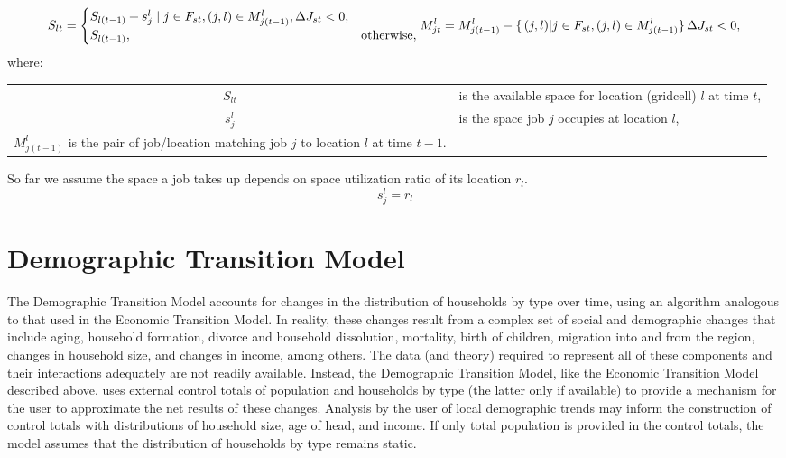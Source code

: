 \begin{equation}
S_{lt} = \begin{cases}
        S_{l(t-1)} + s^l_j \mid j \in F_{st}, (j, l) \in M^l_{j(t-1)},  \Delta J_{st} < 0,\\
        S_{l(t-1)}, & \text{otherwise},\\
    \end{cases}
M^l_{jt} = M^l_{j(t-1)} - \{\, (j, l) | j \in F_{st}, (j, l) \in M^l_{j(t-1)} \}\, \Delta J_{st} < 0, \\
\end{equation}
where:
\begin{center}
\begin{tabular}{c p{5.5in}}
$S_{lt}$ & is the available space for location (gridcell) $l$ at time $t$,\\
$s^l_j$ & is the space job $j$ occupies at location $l$, \\
$M^l_{j(t-1)}$ is the pair of job/location matching job $j$ to location $l$ at time $t-1$. \\
\end{tabular}
\end{center}

So far we assume the space a job takes up depends on space utilization ratio of its location $r_l$.
\begin{equation}
s^l_j = r_l
\end{equation}

\section{Demographic Transition Model}

The Demographic Transition Model accounts for changes in the
distribution of households by type over time, using an algorithm
analogous to that used in the Economic Transition Model.  In
reality, these changes result from a complex set of social and
demographic changes that include aging, household formation,
divorce and household dissolution, mortality, birth of children,
migration into and from the region, changes in household size, and
changes in income, among others.  The data (and theory) required
to represent all of these components and their interactions
adequately are not readily available. Instead, the Demographic
Transition Model, like the Economic Transition Model described
above, uses external control totals of population and households
by type (the latter only if available) to provide a mechanism for
the user to approximate the net results of these changes. Analysis
by the user of local demographic trends may inform the
construction of control totals with distributions of household
size, age of head, and income.  If only total population is
provided in the control totals, the model assumes that the
distribution of households by type remains static.

